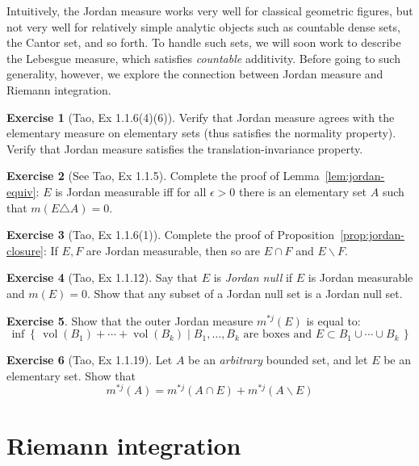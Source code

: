 \documentclass[11pt,oneside]{amsbook}
\newcommand{\set}[1]{\left\{\,#1\,\right\}}
\renewcommand{\setminus}{\smallsetminus}
\DeclareMathOperator{\vol}{vol}
\theoremstyle{definition}
\newtheorem{exerc}{Exercise}[section]
\theoremstyle{plain}
\theoremstyle{definition}
\theoremstyle{remark}
\numberwithin{equation}{section}
\numberwithin{figure}{section}
\begin{document}
Intuitively, the Jordan measure works very well for classical geometric figures, but not very well for relatively simple analytic objects such as countable dense sets, the Cantor set, and so forth. To handle such sets, we will soon work to describe the Lebesgue measure, which satisfies \emph{countable} additivity. Before going to such generality, however, we explore the connection between Jordan measure and Riemann integration.

\begin{exerc}[Tao, Ex 1.1.6(4)(6)]
  Verify that Jordan measure agrees with the elementary measure on elementary sets (thus satisfies the normality property). Verify that Jordan measure satisfies the translation-invariance property.
\end{exerc}

\begin{exerc}[See Tao, Ex 1.1.5]
  Complete the proof of Lemma~\ref{lem:jordan-equiv}: $E$ is Jordan measurable iff for all $\epsilon>0$ there is an elementary set $A$ such that $m(E\triangle A)=0$.
\end{exerc}

\begin{exerc}[Tao, Ex 1.1.6(1)]
  Complete the proof of Proposition~\ref{prop:jordan-closure}: If $E,F$ are Jordan measurable, then so are $E\cap F$ and $E\setminus F$.
\end{exerc}

\begin{exerc}[Tao, Ex 1.1.12]
  Say that $E$ is \emph{Jordan null} if $E$ is Jordan measurable and $m(E)=0$. Show that any subset of a Jordan null set is a Jordan null set.
\end{exerc}

\begin{exerc}
  Show that the outer Jordan measure $m^{*j}(E)$ is equal to:
  \[\inf\set{\vol(B_1)+\cdots+\vol(B_k)\mid B_1,\ldots,B_k\text{ are boxes and }E\subset B_1\cup\cdots\cup B_k}
  \]
\end{exerc}

\begin{exerc}[Tao, Ex 1.1.19]
  Let $A$ be an \emph{arbitrary} bounded set, and let $E$ be an elementary set. Show that
  \[m^{*j}(A)=m^{*j}(A\cap E)+m^{*j}(A\setminus E)
  \]
\end{exerc}

\newpage
\section{Riemann integration}
\end{document}
